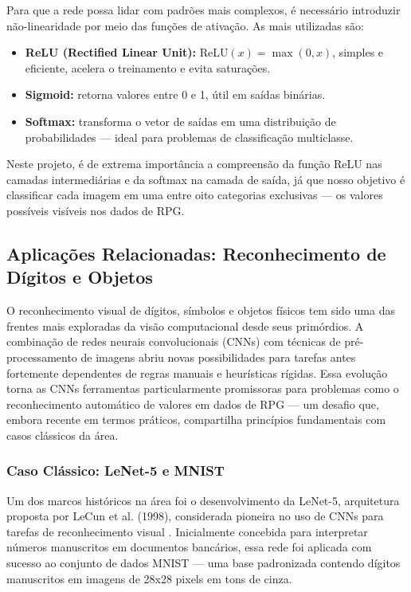 Para que a rede possa lidar com padrões mais complexos, é necessário introduzir não-linearidade por meio das funções de ativação. As mais 
utilizadas são:

\begin{itemize}
    \item \textbf{ReLU (Rectified Linear Unit):} $\text{ReLU}(x) = \max(0, x)$, simples e eficiente, acelera o treinamento e evita saturações.
    \item \textbf{Sigmoid:} retorna valores entre 0 e 1, útil em saídas binárias.
    \item \textbf{Softmax:} transforma o vetor de saídas em uma distribuição de probabilidades — ideal para problemas de classificação 
    multiclasse.
\end{itemize}

Neste projeto, é de extrema importância a compreensão da função ReLU nas camadas intermediárias e da softmax na camada de saída, 
já que nosso objetivo é classificar cada imagem em uma entre oito categorias exclusivas — os valores possíveis visíveis nos dados de RPG. 
\cite{goodfellow2016deep}

\subsection{Aplicações Relacionadas: Reconhecimento de Dígitos e Objetos}

O reconhecimento visual de dígitos, símbolos e objetos físicos tem sido uma das frentes mais exploradas da visão computacional 
desde seus primórdios. A combinação de redes neurais convolucionais (CNNs) com técnicas de pré-processamento de imagens abriu 
novas possibilidades para tarefas antes fortemente dependentes de regras manuais e heurísticas rígidas. Essa evolução torna as 
CNNs ferramentas particularmente promissoras para problemas como o reconhecimento automático de valores em dados de RPG — um desafio 
que, embora recente em termos práticos, compartilha princípios fundamentais com casos clássicos da área.

\subsubsection{Caso Clássico: LeNet-5 e MNIST}

Um dos marcos históricos na área foi o desenvolvimento da LeNet-5, arquitetura proposta por LeCun et al. (1998), considerada pioneira 
no uso de CNNs para tarefas de reconhecimento visual \cite{lecun1998gradient}. Inicialmente concebida para interpretar números 
manuscritos em documentos bancários, essa rede foi aplicada com sucesso ao conjunto de dados MNIST — uma base padronizada contendo 
dígitos manuscritos em imagens de 28x28 pixels em tons de cinza.

